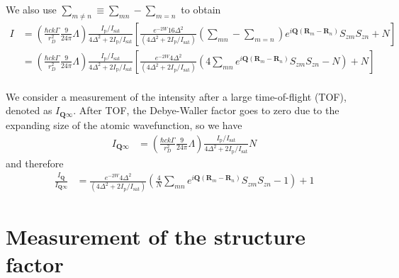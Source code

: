 \documentclass[11pt,letter]{article}
\newcommand{\bv}[1]{\ensuremath{\bm{#1}}}
\newcommand{\iisat}{\ensuremath{I_{\mathrm{p}}/I_{\mathrm{sat}}}}
\newcommand{\Iqtof}{\ensuremath{I_{\bv{Q}\infty} }}
\newcommand{\Iq}{\ensuremath{I_{\bv{Q}} }}
\begin{document}
We also use $\sum_{m\neq n} \equiv \sum_{mn} - \sum_{m=n}$ to obtain  
\begin{equation}
\begin{split} 
 I 
&  =
  \left( 
 \frac{\hbar c k \Gamma}{r_{D}^{2}}  
     \frac{9}{24\pi} \Lambda 
  \right) 
  \frac{ \iisat }{ 4 \Delta^{2} + 2 \iisat }
  \left[
      \frac{ e^{-2W}16 \Delta^{2}  } 
           {(4 \Delta^{2} + 2 \iisat) } 
   \left( \sum_{mn} - \sum_{m=n} \right) 
      e^{ i \bv{Q}( \bv{R}_{m} - \bv{R}_{n} ) } 
      S_{zm}S_{zn}
  + N 
   \right]  \\ 
&  =
  \left( 
 \frac{\hbar c k \Gamma}{r_{D}^{2}}  
     \frac{9}{24\pi} \Lambda 
  \right) 
  \frac{ \iisat }{ 4 \Delta^{2} + 2 \iisat }
  \left[
      \frac{ e^{-2W}4 \Delta^{2}  } 
           {(4 \Delta^{2} + 2 \iisat) } 
   \left( 4\sum_{mn}  
      e^{ i \bv{Q}( \bv{R}_{m} - \bv{R}_{n} ) } 
      S_{zm}S_{zn}
     - N \right)
  + N 
   \right]  \\ 
\end{split}
\label{eq:iscatt-large-detuning}
\end{equation}


We consider a measurement of the intensity after a large time-of-flight (TOF),
denoted as $\Iqtof$.  After TOF, the Debye-Waller factor goes to zero due to
the expanding size of the atomic wavefunction, so we have 
\begin{equation}
\begin{split} 
 \Iqtof
&  =
  \left( 
 \frac{\hbar c k \Gamma}{r_{D}^{2}}  
     \frac{9}{24\pi} \Lambda 
  \right) 
  \frac{ \iisat }{ 4 \Delta^{2} + 2 \iisat } N 
\end{split}
\end{equation}
and therefore
\begin{equation}
\begin{split} 
 \frac{\Iq}{\Iqtof} 
&  =
      \frac{ e^{-2W}4 \Delta^{2}  } 
           {(4 \Delta^{2} + 2 \iisat) } 
   \left(
      \frac{4}{N}\sum_{mn}  
      e^{ i \bv{Q}( \bv{R}_{m} - \bv{R}_{n} ) } 
      S_{zm}S_{zn}
     - 1 \right)
  + 1 
\end{split}
\label{eq:IscattQ}
\end{equation}

\section{Measurement of the structure factor} 
\end{document}
